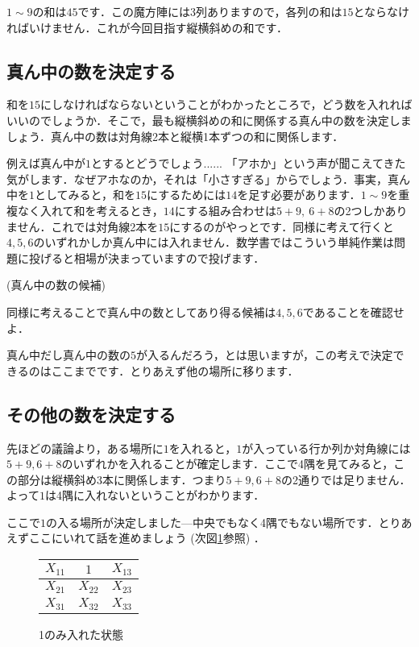 \documentclass[11pt]{jsarticle}
\begin{document}
$1\sim 9$の和は$45$です．この魔方陣には$3$列ありますので，各列の和は$15$とならなければいけません．これが今回目指す縦横斜めの和です．

\subsection{真ん中の数を決定する}
和を$15$にしなければならないということがわかったところで，どう数を入れればいいのでしょうか．そこで，最も縦横斜めの和に関係する真ん中の数を決定しましょう．真ん中の数は対角線2本と縦横1本ずつの和に関係します．

例えば真ん中が$1$とするとどうでしょう...... 「アホか」という声が聞こえてきた気がします．なぜアホなのか，それは「小さすぎる」からでしょう．事実，真ん中を$1$としてみると，和を$15$にするためには$14$を足す必要があります．$1\sim 9$を重複なく入れて和を考えるとき，$14$にする組み合わせは$5+9,\ 6+8$の2つしかありません．これでは対角線2本を$15$にするのがやっとです．同様に考えて行くと$4,5,6$のいずれかしか真ん中には入れません．数学書ではこういう単純作業は問題に投げると相場が決まっていますので投げます．

\begin{screen}
  \begin{prob} (真ん中の数の候補) 

    同様に考えることで真ん中の数としてあり得る候補は$4,5,6$であることを確認せよ．
  \end{prob}
\end{screen}

真ん中だし真ん中の数の$5$が入るんだろう，とは思いますが，この考えで決定できるのはここまでです．とりあえず他の場所に移ります．

\subsection{その他の数を決定する}
先ほどの議論より，ある場所に$1$を入れると，$1$が入っている行か列か対角線には$5+9, 6+8$のいずれかを入れることが確定します．ここで4隅を見てみると，この部分は縦横斜め3本に関係します．つまり$5+9, 6+8$の2通りでは足りません．よって$1$は4隅に入れないということがわかります．

ここで$1$の入る場所が決定しました---中央でもなく4隅でもない場所です．とりあえずここにいれて話を進めましょう (次図\ref{only1}参照) ．

\begin{figure}[H]
  \centering
  \begin{tabular}{|c|c|c|}
    \hline
    $X_{11}$ & $1$ & $X_{13}$ \\ \hline
    $X_{21}$ & $X_{22}$ & $X_{23}$ \\ \hline
    $X_{31}$ & $X_{32}$ & $X_{33}$ \\ \hline
  \end{tabular}
  \caption{1のみ入れた状態}
  \label{only1}
\end{figure}
\end{document}
